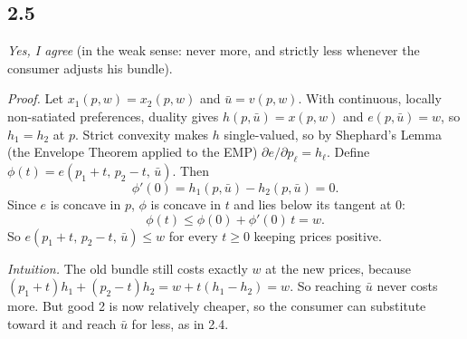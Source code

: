 \documentclass[12pt,letterpaper]{article}
\begin{document}
\subsection*{2.5}

\textit{Yes, I agree} (in the weak sense: never more, and strictly less whenever the consumer adjusts his bundle).

\textit{Proof.} Let $x_1(p,w)=x_2(p,w)$ and $\bar u=v(p,w)$. With continuous, locally non-satiated preferences, duality gives $h(p,\bar u)=x(p,w)$ and $e(p,\bar u)=w$, so $h_1=h_2$ at $p$. Strict convexity makes $h$ single-valued, so by Shephard's Lemma (the Envelope Theorem applied to the EMP) $\partial e/\partial p_\ell=h_\ell$. Define $\phi(t)=e(p_1+t,\,p_2-t,\,\bar u)$. Then
\[
\phi'(0)=h_1(p,\bar u)-h_2(p,\bar u)=0 .
\]
Since $e$ is concave in $p$, $\phi$ is concave in $t$ and lies below its tangent at $0$:
\[
\phi(t)\le\phi(0)+\phi'(0)\,t = w .
\]
So $e(p_1+t,\,p_2-t,\,\bar u)\le w$ for every $t\ge0$ keeping prices positive.

\textit{Intuition.} The old bundle still costs exactly $w$ at the new prices, because $(p_1+t)h_1+(p_2-t)h_2=w+t(h_1-h_2)=w$. So reaching $\bar u$ never costs more. But good 2 is now relatively cheaper, so the consumer can substitute toward it and reach $\bar u$ for less, as in 2.4.
\end{document}
